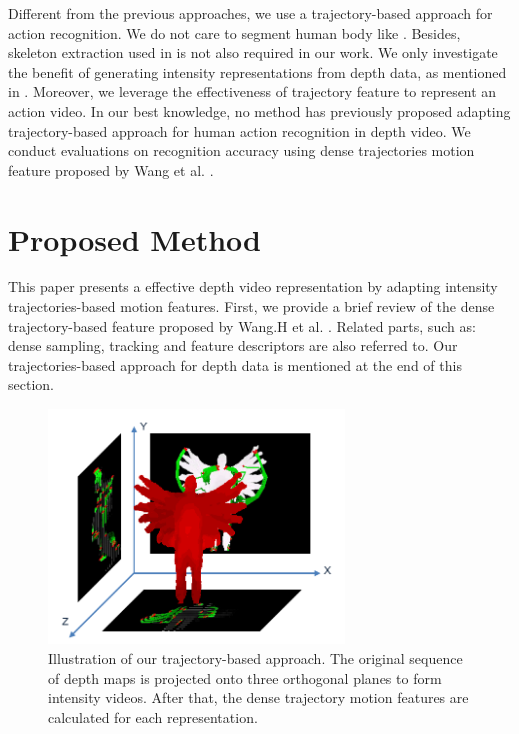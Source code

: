 \documentclass[review]{elsarticle}
\begin{document}
Different from the previous approaches, we use a trajectory-based approach for action recognition. We do not care to segment human body like \cite{li2010action,yang2012recognizing}. Besides, skeleton extraction used in \cite{yang2012eigenjoints, wang2012mining} is not also required in our work. We only investigate the benefit of generating intensity representations from depth data, as mentioned in \cite{li2010action,yang2012recognizing}. Moreover, we leverage the effectiveness of trajectory feature to represent an action video. In our best knowledge, no method has previously proposed adapting trajectory-based approach for human action recognition in depth video. We conduct evaluations on recognition accuracy using dense trajectories motion feature proposed by Wang et al. \cite{wang2011densetraj}.

\section{Proposed Method}
\label{lbl:ProposedMethod}

This paper presents a effective depth video representation by adapting intensity trajectories-based motion features. First, we provide a brief review of the dense trajectory-based feature proposed by Wang.H et al. \cite{wang2011densetraj}. Related parts, such as: dense sampling, tracking and feature descriptors are also referred to. Our trajectories-based approach for depth data is mentioned at the end of this section.

\begin{figure}
	\begin{center}
		\includegraphics[width=0.7\textwidth]{Projections.png}
	\end{center}
	\caption{\label{lbl:Figure_ProposedMethod}Illustration of our trajectory-based approach. The original sequence of depth maps is projected onto three orthogonal planes to form intensity videos. After that, the dense trajectory motion features are calculated for each representation.}
\end{figure}
\end{document}
